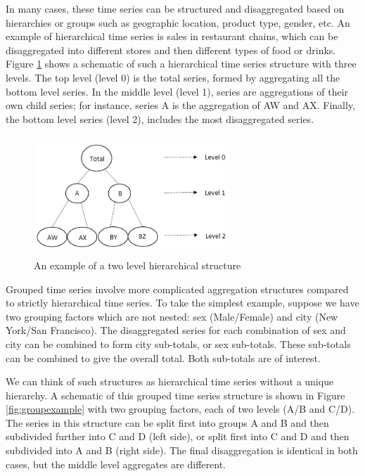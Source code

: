 \documentclass[11pt,a4paper,]{article}
\begin{document}
In many cases, these time series can be structured and disaggregated
based on hierarchies or groups such as geographic location, product
type, gender, etc. An example of hierarchical time series is sales in
restaurant chains, which can be disaggregated into different stores and
then different types of food or drinks. Figure
\ref{fig:hierarchicalexample} shows a schematic of such a hierarchical
time series structure with three levels. The top level (level 0) is the
total series, formed by aggregating all the bottom level series. In the
middle level (level 1), series are aggregations of their own child
series; for instance, series A is the aggregation of AW and AX. Finally,
the bottom level series (level 2), includes the most disaggregated
series.

\begin{figure}

{\centering \includegraphics[width=280px,height=170px]{Paper-Figures/hierarchical_example} 

}

\caption{An example of a two level hierarchical structure}\label{fig:hierarchicalexample}
\end{figure}

Grouped time series involve more complicated aggregation structures
compared to strictly hierarchical time series. To take the simplest
example, suppose we have two grouping factors which are not nested: sex
(Male/Female) and city (New York/San Francisco). The disaggregated
series for each combination of sex and city can be combined to form city
sub-totals, or sex sub-totals. These sub-totals can be combined to give
the overall total. Both sub-totals are of interest.

We can think of such structures as hierarchical time series without a
unique hierarchy. A schematic of this grouped time series structure is
shown in Figure \ref{fig:groupexample} with two grouping factors, each
of two levels (A/B and C/D). The series in this structure can be split
first into groups A and B and then subdivided further into C and D (left
side), or split first into C and D and then subdivided into A and B
(right side). The final disaggregation is identical in both cases, but
the middle level aggregates are different.
\end{document}
